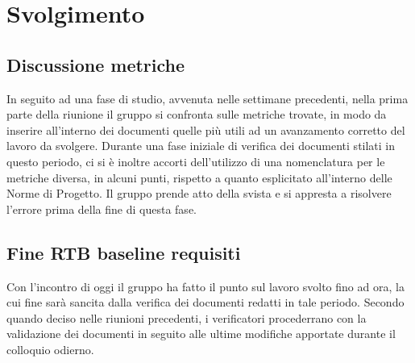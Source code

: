 \section{Svolgimento}
\subsection{Discussione metriche}
In seguito ad una fase di studio, avvenuta nelle settimane precedenti, nella prima parte della riunione il gruppo si confronta sulle metriche trovate, in modo da inserire all'interno dei \newline documenti quelle più utili ad un avanzamento corretto del lavoro da svolgere. 
Durante una fase iniziale di verifica dei documenti stilati in questo periodo, ci si è inoltre accorti dell'utilizzo di una nomenclatura per le metriche diversa, in alcuni punti, rispetto a quanto esplicitato all'interno delle Norme di Progetto. Il gruppo prende atto della svista e si appresta a risolvere l'errore prima della fine di questa fase.

\subsection{Fine RTB baseline requisiti}
Con l'incontro di oggi il gruppo ha fatto il punto sul lavoro svolto fino ad ora, la cui fine sarà sancita dalla verifica dei documenti redatti in tale periodo. Secondo quando deciso nelle riunioni precedenti, i verificatori procederrano con la validazione dei documenti in seguito alle ultime modifiche apportate durante il colloquio odierno.

